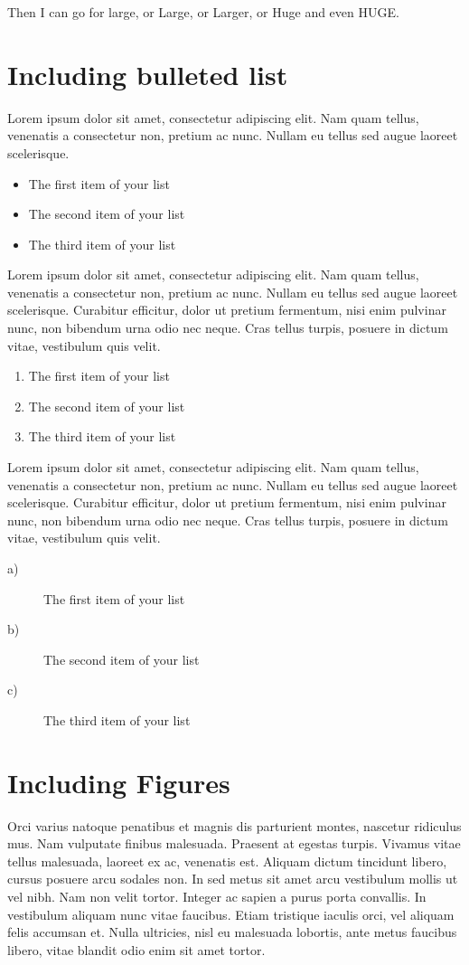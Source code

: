 Then I can go for {\large{large}}, or {\Large{Large}}, or {\LARGE{Larger}}, or {\huge{Huge}} and even {\Huge{HUGE}}.

\section{Including bulleted list}
Lorem ipsum dolor sit amet, consectetur adipiscing elit. Nam quam tellus, venenatis a consectetur non, pretium ac nunc. Nullam eu tellus sed augue laoreet scelerisque. 

\begin{itemize}
    \item The first item of your list
    \item The second item of your list
    \item The third item of your list
\end{itemize}

Lorem ipsum dolor sit amet, consectetur adipiscing elit. Nam quam tellus, venenatis a consectetur non, pretium ac nunc. Nullam eu tellus sed augue laoreet scelerisque. Curabitur efficitur, dolor ut pretium fermentum, nisi enim pulvinar nunc, non bibendum urna odio nec neque. Cras tellus turpis, posuere in dictum vitae, vestibulum quis velit.

\begin{enumerate}
    \item The first item of your list
    \item The second item of your list
    \item The third item of your list
\end{enumerate}

Lorem ipsum dolor sit amet, consectetur adipiscing elit. Nam quam tellus, venenatis a consectetur non, pretium ac nunc. Nullam eu tellus sed augue laoreet scelerisque. Curabitur efficitur, dolor ut pretium fermentum, nisi enim pulvinar nunc, non bibendum urna odio nec neque. Cras tellus turpis, posuere in dictum vitae, vestibulum quis velit. 

\begin{description}
    \item[a)] The first item of your list
    \item[b)] The second item of your list
    \item[c)] The third item of your list
\end{description}
 

\section{Including Figures}
Orci varius natoque penatibus et magnis dis parturient montes, nascetur ridiculus mus. Nam vulputate finibus malesuada. Praesent at egestas turpis. Vivamus vitae tellus malesuada, laoreet ex ac, venenatis est. Aliquam dictum tincidunt libero, cursus posuere arcu sodales non. In sed metus sit amet arcu vestibulum mollis ut vel nibh. Nam non velit tortor. Integer ac sapien a purus porta convallis. In vestibulum aliquam nunc vitae faucibus. Etiam tristique iaculis orci, vel aliquam felis accumsan et. Nulla ultricies, nisl eu malesuada lobortis, ante metus faucibus libero, vitae blandit odio enim sit amet tortor.

